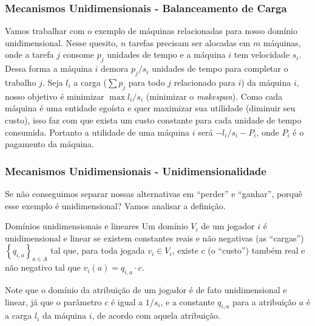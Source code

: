\documentclass{beamer}
\begin{document}
\begin{frame}
    \frametitle{Mecanismos Unidimensionais - Balanceamento de Carga}
    Vamos trabalhar com o exemplo de máquinas relacionadas para nosso domínio unidimensional. Nesse quesito, $n$ tarefas precisam ser alocadas em $m$ máquinas, onde a tarefa $j$ consome $p_j$ unidades de tempo e a máquina $i$ tem velocidade $s_i$. Dessa forma a máquina $i$ demora $p_j/s_i$ unidades de tempo para completar o trabalho $j$. Seja $l_i$ a carga ($\sum{p_j}$ para todo $j$ relacionado para $i$) da máquina $i$, nosso objetivo é minimizar $\max{l_i/s_i}$ (minimizar o \textit{makespan}). Como cada máquina é uma entidade egoísta e quer maximizar sua utilidade (diminuir seu custo), isso faz com que exista um custo constante para cada unidade de tempo consumida. Portanto a utilidade de uma máquina $i$ será $-l_i/s_i - P_i$, onde $P_i$ é o pagamento da máquina.
\end{frame}

\begin{frame}
    \frametitle{Mecanismos Unidimensionais - Unidimensionalidade}
    Se não conseguimos separar nossas alternativas em ``perder'' e ``ganhar'', porquê esse exemplo é unidimensional? Vamos analisar a definição. %

    \begin{block}{Domínios unidimensionais e lineares}
        Um domínio $V_i$ de um jogador $i$ é unidimensional e linear se existem constantes reais e não negativas (as ``cargas'') $\left\{q_{i, a}\right\}_{a \in A}$ tal que, para toda jogada $v_i \in V_i$, existe $c$ (o ``custo'') também real e não negativo tal que $v_i(a) = q_{i, a} \cdot c$.
    \end{block} %
    Note que o domínio da atribuição de um jogador é de fato unidimensional e linear, já que o parâmetro $c$ é igual a $1/s_i$, e a constante $q_{i, a}$ para a atribuição $a$ é a carga $l_i$ da máquina $i$, de acordo com aquela atribuição.
\end{frame}
\end{document}
